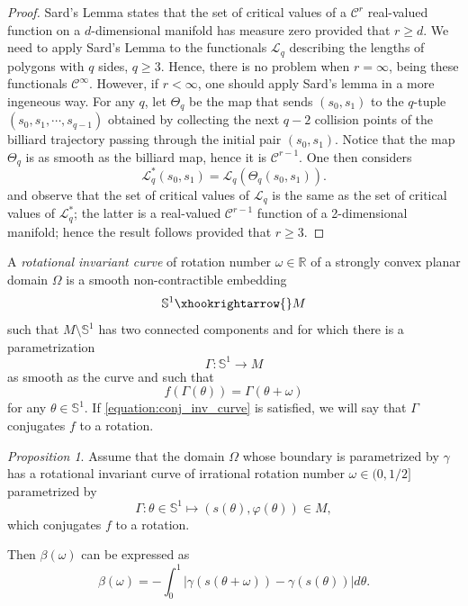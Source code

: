 \documentclass[12pt, openany]{amsart}
\theoremstyle{definition}
\theoremstyle{remark}
\theoremstyle{remark}
\theoremstyle{theorem}
\theoremstyle{theorem}
\theoremstyle{theorem}
\newtheorem{proposition}[theorem]{Proposition}
\theoremstyle{theorem}
\newcommand{\RR}{\mathbb{R}}
\renewcommand{\SS}{\mathbb{S}}
\begin{document}
\begin{proof}
Sard's Lemma states that the set of critical values of a $\mathscr C^r$ real-valued function 
on a $d$-dimensional manifold has measure zero provided that $r \geq d$.  We need to apply  Sard's Lemma to the functionals $\mathcal{L}_q$ describing the lengths of polygons with $q$ sides, $q\geq 3$. Hence, there is no problem when  $r = \infty$, being these functionals $\mathscr C ^\infty$. 
However, if $r < \infty$, one should apply Sard's lemma in a more ingeneous way.
For any $q$, let $\Theta_q$ be the map that sends 
$(s_0, s_1)$ to the $q$-tuple $(s_0, s_1, \cdots, s_{q-1})$ obtained by collecting the next 
$q - 2$ collision points of the billiard trajectory passing through the initial pair 
$(s_0, s_1)$. Notice that the map $\Theta_q$ is as smooth as the billiard map, hence it is 
$\mathscr C^{r-1}$. One then considers
\[
\mathcal{L}^*_q(s_0, s_1) = \mathcal{L}_q(\Theta_q(s_0, s_1)).
\]
and observe that the set of critical values of $\mathcal{L}_q$ is the same as the set of critical values 
of $\mathcal{L}^*_q$; the latter is a real-valued $\mathscr C^{r-1}$ function of a 2-dimensional 
manifold; hence the result follows provided that $r \geq 3$.
\end{proof}


A \textit{rotational invariant curve} of rotation number $\omega\in\RR$ of a strongly convex planar domain $\Omega$ is a smooth non-contractible embedding 
\[
\SS^1\xhookrightarrow{} M
\]
such that $M\setminus\SS^1$ has two connected components and for which there is a parametrization
\[
\Gamma:\SS^1\longrightarrow M
\]
as smooth as the curve and such that
\begin{equation}
\label{equation:conj_inv_curve}
f\left(\Gamma(\theta)\right) = \Gamma(\theta+\omega)
\end{equation}
for any $\theta\in\SS^1$. If \eqref{equation:conj_inv_curve} is satisfied, we will say that $\Gamma$ conjugates $f$ to a rotation.

\begin{proposition}
\label{proposition:expression_beta_inv_curve}
Assume that the domain $\Omega$ whose boundary is parametrized by $\gamma$ has a rotational invariant curve of irrational rotation number $\omega\in(0,1/2]$ parametrized by
\[
\Gamma:\theta\in\SS^1\mapsto(s(\theta),\varphi(\theta))\in M,
\]
which conjugates $f$ to a rotation.

Then $\beta(\omega)$ can be expressed as
\begin{equation}
\label{equation:beta_inv_curve}
\beta(\omega) = -\int_0^1|\gamma(s(\theta+\omega))-\gamma(s(\theta))|d\theta.
\end{equation}
\end{proposition}
\end{document}
